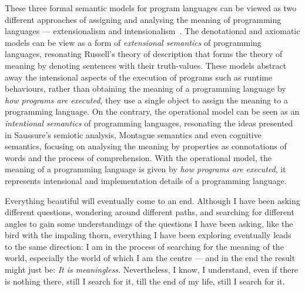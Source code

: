 \begin{highlightnew}
These three formal semantic models for program languages can be viewed as two different approaches of assigning and analysing the meaning of programming languages --- extensionalism and intensionalism~\citep{viva}. The denotational and axiomatic models can be view as a form of \emph{extensional semantics} of programming languages, resonating Russell's theory of description that forms the theory of meaning by denoting sentences with their truth-values. These models abstract away the intensional aspects of the execution of programs such as runtime behaviours, rather than obtaining the meaning of a programming language by \emph{how programs are executed}, they use a single object to assign the meaning to a programming language. On the contrary, the operational model can be seen as an \emph{intentional semantics} of programming languages, resonating the ideas presented in Saussure's semiotic analysis, Montague semantics and even cognitive semantics, focusing on analysing the meaning by properties as connotations of words and the process of comprehension. With the operational model, the meaning of a programming language is given by \emph{how programs are executed}, it represents intensional and implementation details of a programming language.
\end{highlightnew}

\begin{center}
\vspace{-0.7em}
\vspace{-0.3em}
\end{center}

Everything beautiful will eventually come to an end. Although I have been asking different questions, wondering around different paths, and searching for different angles to gain some understandings of the questions I have been asking, like the bird with the impaling thorn, everything I have been exploring eventually leads to the same direction: I am in the process of searching for the meaning of the world, especially the world of which I am the centre --- and in the end the result might just be: \emph{It is meaningless}. Nevertheless, I know, I understand, even if there is nothing there, still I search for it, till the end of my life, still I search for it.